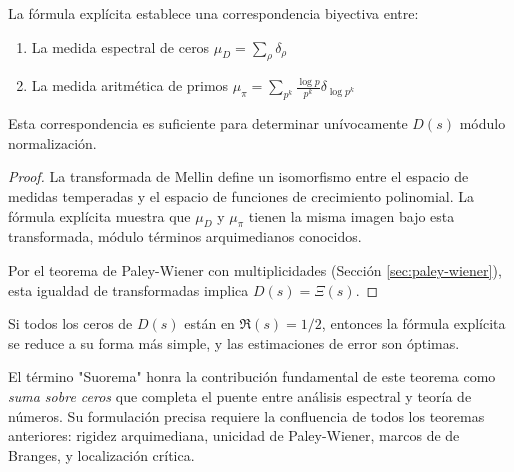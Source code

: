 \begin{theorem}\label{thm:suorema-completeness}
La fórmula explícita establece una correspondencia biyectiva entre:
\begin{enumerate}
\item La medida espectral de ceros $\mu_D = \sum_\rho \delta_\rho$
\item La medida aritmética de primos $\mu_\pi = \sum_{p^k} \frac{\log p}{p^k} \delta_{\log p^k}$
\end{enumerate}
Esta correspondencia es suficiente para determinar unívocamente $D(s)$ módulo normalización.
\end{theorem}

\begin{proof}
La transformada de Mellin define un isomorfismo entre el espacio de medidas temperadas
y el espacio de funciones de crecimiento polinomial. La fórmula explícita muestra que
$\mu_D$ y $\mu_\pi$ tienen la misma imagen bajo esta transformada, módulo términos
arquimedianos conocidos.

Por el teorema de Paley-Wiener con multiplicidades (Sección \ref{sec:paley-wiener}),
esta igualdad de transformadas implica $D(s) = \Xi(s)$.
\end{proof}

\begin{cor}
Si todos los ceros de $D(s)$ están en $\Re(s) = 1/2$, entonces la fórmula explícita 
se reduce a su forma más simple, y las estimaciones de error son óptimas.
\end{cor}

\begin{remark}
El término "Suorema" honra la contribución fundamental de este teorema como 
\emph{suma sobre ceros} que completa el puente entre análisis espectral y teoría
de números. Su formulación precisa requiere la confluencia de todos los teoremas
anteriores: rigidez arquimediana, unicidad de Paley-Wiener, marcos de de Branges,
y localización crítica.
\end{remark}
